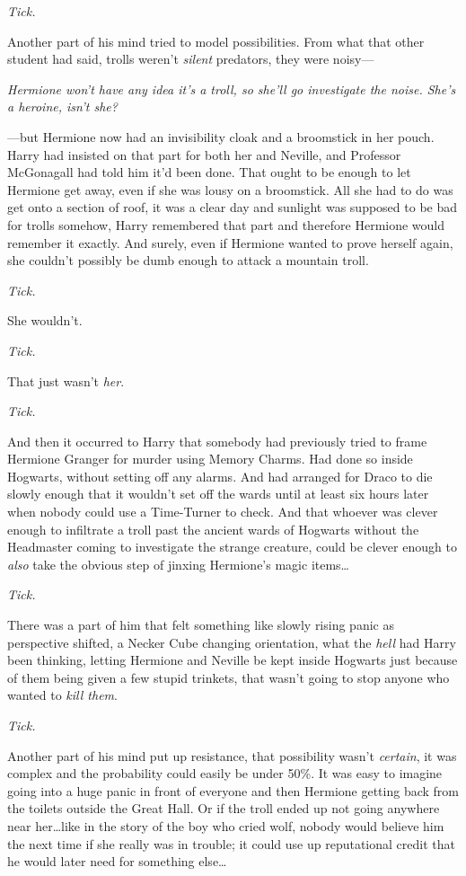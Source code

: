 \emph{Tick.}

Another part of his mind tried to model possibilities. From what that other student had said, trolls weren’t \emph{silent} predators, they were noisy—

\emph{Hermione won’t have any idea it’s a troll, so she’ll go investigate the noise. She’s a heroine, isn’t she?}

—but Hermione now had an invisibility cloak and a broomstick in her pouch. Harry had insisted on that part for both her and Neville, and Professor McGonagall had told him it’d been done. That ought to be enough to let Hermione get away, even if she was lousy on a broomstick. All she had to do was get onto a section of roof, it was a clear day and sunlight was supposed to be bad for trolls somehow, Harry remembered that part and therefore Hermione would remember it exactly. And surely, even if Hermione wanted to prove herself again, she couldn’t possibly be dumb enough to attack a mountain troll.

\emph{Tick.}

She wouldn’t.

\emph{Tick.}

That just wasn’t \emph{her}.

\emph{Tick.}

And then it occurred to Harry that somebody had previously tried to frame Hermione Granger for murder using Memory Charms. Had done so inside Hogwarts, without setting off any alarms. And had arranged for Draco to die slowly enough that it wouldn’t set off the wards until at least six hours later when nobody could use a Time-Turner to check. And that whoever was clever enough to infiltrate a troll past the ancient wards of Hogwarts without the Headmaster coming to investigate the strange creature, could be clever enough to \emph{also} take the obvious step of jinxing Hermione’s magic items…

\emph{Tick.}

There was a part of him that felt something like slowly rising panic as perspective shifted, a Necker Cube changing orientation, what the \emph{hell} had Harry been thinking, letting Hermione and Neville be kept inside Hogwarts just because of them being given a few stupid trinkets, that wasn’t going to stop anyone who wanted to \emph{kill them}.

\emph{Tick.}

Another part of his mind put up resistance, that possibility wasn’t \emph{certain}, it was complex and the probability could easily be under 50\%. It was easy to imagine going into a huge panic in front of everyone and then Hermione getting back from the toilets outside the Great Hall. Or if the troll ended up not going anywhere near her…like in the story of the boy who cried wolf, nobody would believe him the next time if she really was in trouble; it could use up reputational credit that he would later need for something else…

